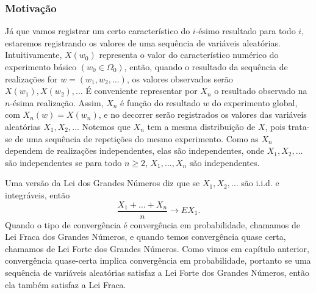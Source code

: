 \begin{frame}
\frametitle{\textbf{Motivação}}
\baselineskip=13pt
\begin{block}{}


Já que vamos registrar um certo característico do $i$-ésimo
resultado para todo $i$, estaremos registrando os valores de uma
sequência de variáveis aleatórias. Intuitivamente, $X(w_0)$
representa o valor do característico numérico do experimento básico
$(w_0\in\Omega_0)$, então, quando o resultado da sequência de
realizações for $w=(w_1,w_2,\ldots)$, os valores observados serão
$X(w_1),X(w_2),\ldots$ É conveniente representar por $X_n$ o
resultado observado na $n$-ésima realização. Assim, $X_n$ é função
do resultado $w$ do experimento global, com $X_n(w)=X(w_n)$, e no
decorrer serão registrados os valores das variáveis aleatórias
$X_1,X_2,\ldots$ Notemos que $X_n$ tem a mesma distribuição de $X$,
pois trata-se de uma sequência de repetições do mesmo experimento.
Como as $X_n$ dependem de realizações independentes, elas são
independentes, onde $X_1,X_2,\ldots$ são independentes se para todo
$n\geq 2$, $X_1,\ldots, X_n$ são independentes. \\ \bigskip

Uma versão da Lei dos Grandes Números diz que se $X_1,X_2,\ldots$
são i.i.d. e integráveis, então
$$\frac{X_1+\ldots+X_n}{n}\rightarrow EX_1.$$
Quando o tipo de convergência é convergência em probabilidade,
chamamos de Lei Fraca dos Grandes Números, e quando temos
convergência quase certa, chamamos de Lei Forte dos Grandes Números. Como vimos em capítulo anterior, convergência quase-certa implica convergência em probabilidade, portanto se uma sequência de variáveis aleatórias satisfaz a Lei Forte dos Grandes Números, então ela também satisfaz a Lei Fraca.

\end{block}
\end{frame}


%
%
%


